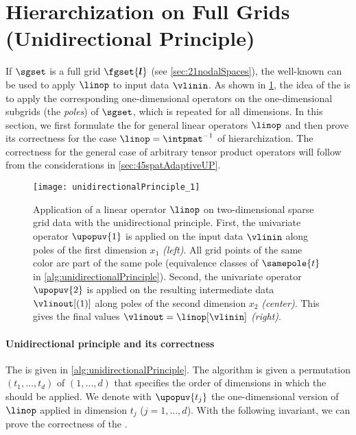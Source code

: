 \section{Hierarchization on Full Grids (Unidirectional Principle)}
\label{sec:42fullGrids}

If $\sgset$ is a full grid $\fgset{\*l}$
(see \cref{sec:21nodalSpaces}),
the well-known \emph{\up}
can be used to apply $\linop$ to input data $\vlinin$.
As shown in \cref{fig:unidirectionalPrinciple}, the idea of the \up
is to apply the corresponding one-dimensional operators on the
one-dimensional subgrids (the \emph{poles}) of $\sgset$,
which is repeated for all dimensions.
In this section, we first formulate the \up for
general linear operators $\linop$ and then prove its correctness for
the case $\linop = \intpmatinv$ of hierarchization.
The correctness for the general case of arbitrary tensor product operators
will follow from the considerations in \cref{sec:45spatAdaptiveUP}.

\begin{figure}
  \texttt{[image: unidirectionalPrinciple\_1]}%
  \caption[%
    Unidirectional principle%
  ]{%
    Application of a linear operator $\linop$
    on two-dimensional sparse grid data with the unidirectional principle.
    First, the univariate operator $\upopuv{1}$ is applied on
    the input data $\vlinin$
    along poles of the first dimension $x_1$ \emph{(left)}.
    All grid points of the same color are part of the same pole
    (equivalence classes of $\samepole{t}$ in
    \cref{alg:unidirectionalPrinciple}).
    Second, the univariate operator $\upopuv{2}$ is applied on the
    resulting intermediate data $\vlinout[(1)]$
    along poles of the second dimension $x_2$ \emph{(center)}.
    This gives the final values $\vlinout = \linop[\vlinin]$ \emph{(right)}.%
  }%
  \label{fig:unidirectionalPrinciple}%
\end{figure}

\paragraph{Unidirectional principle and its correctness}

The \up is given in \cref{alg:unidirectionalPrinciple}.
The algorithm is given a permutation $(t_1, \dotsc, t_d)$ of $(1, \dotsc, d)$
that specifies the order of dimensions in which the \up should be applied.
We denote with $\upopuv{t_j}$ the one-dimensional version of $\linop$
applied in dimension $t_j$ ($j = 1, \dotsc, d$).
With the following invariant, we can prove the correctness of the \up.

